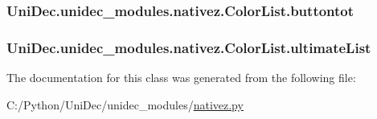 \subsubsection[{buttontot}]{\setlength{\rightskip}{0pt plus 5cm}Uni\+Dec.\+unidec\+\_\+modules.\+nativez.\+Color\+List.\+buttontot}\label{class_uni_dec_1_1unidec__modules_1_1nativez_1_1_color_list_a94a55aaee0c75c2e984d44ee33834ae8}
\hypertarget{class_uni_dec_1_1unidec__modules_1_1nativez_1_1_color_list_a92dd7a67dff33698f6977aa973b61fdd}{}
\subsubsection[{ultimate\+List}]{\setlength{\rightskip}{0pt plus 5cm}Uni\+Dec.\+unidec\+\_\+modules.\+nativez.\+Color\+List.\+ultimate\+List}\label{class_uni_dec_1_1unidec__modules_1_1nativez_1_1_color_list_a92dd7a67dff33698f6977aa973b61fdd}


The documentation for this class was generated from the following file\+:\begin{DoxyCompactItemize}
\item 
C\+:/\+Python/\+Uni\+Dec/unidec\+\_\+modules/\hyperlink{nativez_8py}{nativez.\+py}\end{DoxyCompactItemize}
